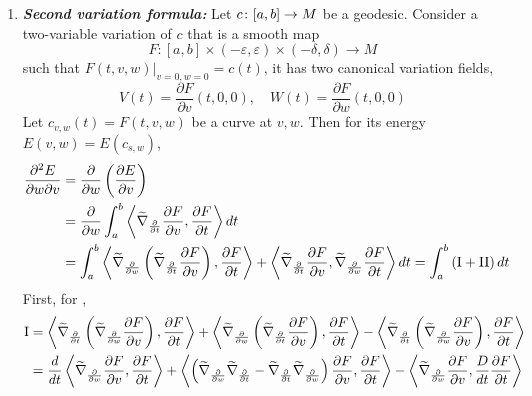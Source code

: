 \begin{enumerate}[label=\arabic{*}.]
	\item \emph{\textbf{Second variation formula:}} Let $c \colon [a,b] \rightarrow M$ be a geodesic. Consider a two-variable variation of $c$ that is a smooth map
	\begin{equation*}
		F \colon [a,b] \times (-\varepsilon,\varepsilon) \times (-\delta,\delta) \longrightarrow M
	\end{equation*}
	such that $F(t,v,w)|_{v=0,w=0} = c(t)$, it has two canonical variation fields,
	\begin{equation*}
		V(t) = \frac{\partial F}{\partial v}(t,0,0),\quad W(t) = \frac{\partial F}{\partial w}(t,0,0)
	\end{equation*}
	Let $c_{v,w}(t) = F(t,v,w)$ be a curve at $v,w$. Then for its energy $E(v,w) = E(c_{s,w})$,
	\begin{equation*}
		\begin{aligned}
			\frac{\partial^2 E}{\partial w \partial v} &= \frac{\partial}{\partial w}\bc{\frac{\partial E}{\partial v}} \\
			&= \frac{\partial}{\partial w}\int_a^b\inn{\widetilde{\nabla}_{\frac{\partial}{\partial t}}\frac{\partial F}{\partial v}, \frac{\partial F}{\partial t}}dt \\
			&= \int_a^b\inn{\widetilde{\nabla}_{\frac{\partial}{\partial w}}\bc{\widetilde{\nabla}_{\frac{\partial}{\partial t}}\frac{\partial F}{\partial v}}, \frac{\partial F}{\partial t}} + \inn{\widetilde{\nabla}_{\frac{\partial}{\partial t}}\frac{\partial F}{\partial v}, \widetilde{\nabla}_{\frac{\partial}{\partial w}}\frac{\partial F}{\partial t}}dt = \int_a^b\bc{\text{\RNum{1}} + \text{\RNum{2}}}dt
		\end{aligned}
	\end{equation*}
	First, for ,
	\begin{equation*}
		\begin{aligned}
			\text{\RNum{1}} &= \inn{\widetilde{\nabla}_{\frac{\partial}{\partial t}}\bc{\widetilde{\nabla}_{\frac{\partial}{\partial w}}\frac{\partial F}{\partial v}}, \frac{\partial F}{\partial t}}+ \inn{\widetilde{\nabla}_{\frac{\partial}{\partial w}}\bc{\widetilde{\nabla}_{\frac{\partial}{\partial t}}\frac{\partial F}{\partial v}}, \frac{\partial F}{\partial t}} -  \inn{\widetilde{\nabla}_{\frac{\partial}{\partial t}}\bc{\widetilde{\nabla}_{\frac{\partial}{\partial w}}\frac{\partial F}{\partial v}}, \frac{\partial F}{\partial t}} \\
			&= \frac{d}{dt}\inn{\widetilde{\nabla}_{\frac{\partial}{\partial w}}\frac{\partial F}{\partial v}, \frac{\partial F}{\partial t}}+ \inn{\bc{\widetilde{\nabla}_{\frac{\partial}{\partial w}}\widetilde{\nabla}_{\frac{\partial}{\partial t}} - \widetilde{\nabla}_{\frac{\partial}{\partial t}}\widetilde{\nabla}_{\frac{\partial}{\partial w}}}\frac{\partial F}{\partial v}, \frac{\partial F}{\partial t}}-\inn{\widetilde{\nabla}_{\frac{\partial}{\partial w}}\frac{\partial F}{\partial v}, \frac{D}{dt}\frac{\partial F}{\partial t}}

\end{aligned}
\end{equation*}
\end{enumerate}
